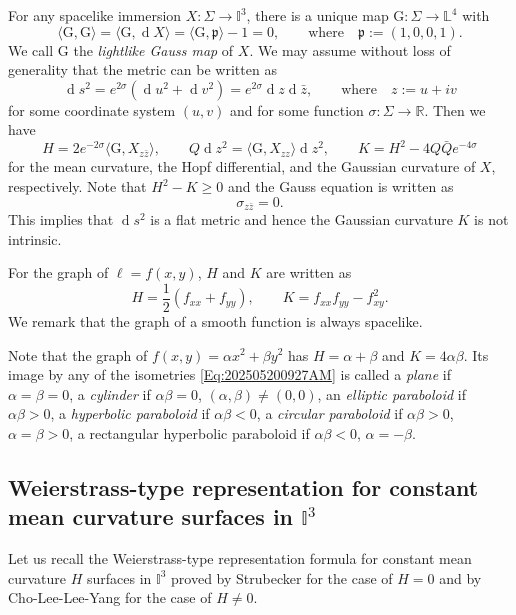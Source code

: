 \documentclass[12pt,a4paper,reqno]{amsart}
\theoremstyle{plain} %
\theoremstyle{definition}
\newcommand{\rmG}{\mathrm{G}}
\begin{document}
For any spacelike immersion $X\colon\Sigma \to \mathbb{I}^3$,
there is a unique map $\rmG \colon \Sigma \to \mathbb{L}^4$ with
	\[
		\langle \rmG, \rmG \rangle 
		= \langle \rmG, \operatorname{d}\!X \rangle 
		= \langle \rmG, \mathfrak{p} \rangle -1 = 0,
		\qquad\text{where}\quad \mathfrak{p} := (1,0,0,1).
	\]
We call $\rmG$ the {\it lightlike Gauss map} of $X$. We may assume without loss of generality that the metric can be written as
	\[
		\operatorname{d}\!s^2=e^{2{\sigma}}(\operatorname{d}\!u^2+\operatorname{d}\!v^2)=e^{2{\sigma}}\operatorname{d}\!z\operatorname{d}\!\bar{z},\qquad\text{where}\quad z := u+iv
	\]
for some coordinate system  $(u,v)$ and for some function $\sigma \colon \Sigma \to \mathbb{R}$. 
Then we have
	\[
		H =2e^{-2\sigma}\langle \rmG, X_{z\bar{z}} \rangle, 								\qquad
		Q\operatorname{d}\!z^2 = \langle \rmG, X_{zz} \rangle\operatorname{d}\!z^2,		\qquad
		K=H^2-4Q\bar{Q}e^{-4{\sigma}}
	\]
for the mean curvature, the Hopf differential, and the Gaussian curvature of $X$, respectively.
Note that $H^2 - K \ge 0$ and the Gauss equation is written as
	\[
		\sigma_{z\bar{z}}=0.
	\]
This implies that $\operatorname{d}\!s^2$ is a flat metric and hence the Gaussian curvature $K$ is not intrinsic.

For the graph of $\ell=f(x,y)$, $H$ and $K$ are written as
	\begin{equation}\label{eq:HK}
		H=\frac{1}{2}(f_{xx}+f_{yy}),\qquad K=f_{xx}f_{yy}-f_{xy}^2.
	\end{equation}
We remark that the graph of a smooth function is always spacelike. 

Note that the graph of $f(x,y) = \alpha x^2 + \beta y^2$ has $H=\alpha+\beta$ and $K=4\alpha \beta$. Its image by any of the isometries \eqref{Eq:202505200927AM} is called a {\it plane} if $\alpha=\beta=0$, a {\it cylinder} if $\alpha\beta=0$, $(\alpha,\beta)\neq (0,0)$, an {\it elliptic paraboloid} if $\alpha\beta>0$, a {\it hyperbolic paraboloid} if $\alpha\beta<0$, a {\it circular paraboloid} if $\alpha\beta>0$, $\alpha=\beta>0$,  a rectangular hyperbolic paraboloid if $\alpha\beta<0$, $\alpha=-\beta$.

\subsection{Weierstrass-type representation for constant mean curvature surfaces in $\mathbb{I}^3$}\label{sec:representation}

Let us recall the Weierstrass-type representation formula for constant mean curvature $H$ surfaces in $\mathbb{I}^3$ proved by Strubecker \cite{StrubeckerIII} for the case of $H=0$ and by Cho-Lee-Lee-Yang \cite{CLLY} for the case of $H\neq 0$.
\end{document}
